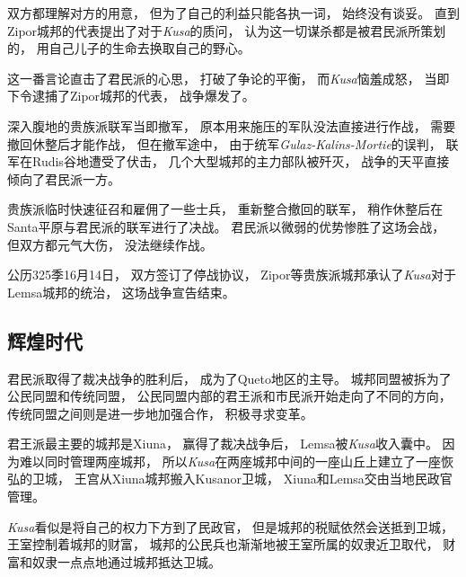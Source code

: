 \documentclass[UTF8,12pt,draft]{ctexbook}
\begin{document}
                双方都理解对方的用意，
                但为了自己的利益只能各执一词，
                始终没有谈妥。
                直到Zipor城邦的代表提出了对于\emph{Kusa}的质问，
                认为这一切谋杀都是被君民派所策划的，
                用自己儿子的生命去换取自己的野心。

                这一番言论直击了君民派的心思，
                打破了争论的平衡，
                而\emph{Kusa}恼羞成怒，
                当即下令逮捕了Zipor城邦的代表，
                战争爆发了。

                深入腹地的贵族派联军当即撤军，
                原本用来施压的军队没法直接进行作战，
                需要撤回休整后才能作战，
                但在撤军途中，
                由于统军\emph{Gulaz-Kalins-Mortie}的误判，
                联军在Rudis谷地遭受了伏击，
                几个大型城邦的主力部队被歼灭，
                战争的天平直接倾向了君民派一方。

                贵族派临时快速征召和雇佣了一些士兵，
                重新整合撤回的联军，
                稍作休整后在Santa平原与君民派的联军进行了决战。
                君民派以微弱的优势惨胜了这场会战，
                但双方都元气大伤，
                没法继续作战。

                公历325季16月14日，
                双方签订了停战协议，
                Zipor等贵族派城邦承认了\emph{Kusa}对于Lemsa城邦的统治，
                这场战争宣告结束。
            \subsection{辉煌时代}
                君民派取得了裁决战争的胜利后，
                成为了Queto地区的主导。
                城邦同盟被拆为了公民同盟和传统同盟，
                公民同盟内部的君王派和市民派开始走向了不同的方向，
                传统同盟之间则是进一步地加强合作，
                积极寻求变革。

                君王派最主要的城邦是Xiuna，
                赢得了裁决战争后，
                Lemsa被\emph{Kusa}收入囊中。
                因为难以同时管理两座城邦，
                所以\emph{Kusa}在两座城邦中间的一座山丘上建立了一座恢弘的卫城，
                王宫从Xiuna城邦搬入Kusanor卫城，
                Xiuna和Lemsa交由当地民政官管理。

                \emph{Kusa}看似是将自己的权力下方到了民政官，
                但是城邦的税赋依然会送抵到卫城，
                王室控制着城邦的财富，
                城邦的公民兵也渐渐地被王室所属的奴隶近卫取代，
                财富和奴隶一点点地通过城邦抵达卫城。
\end{document}
